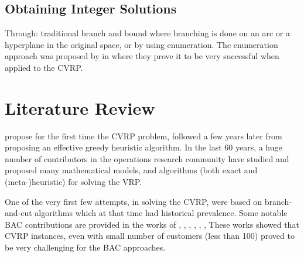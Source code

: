 \subsection{Obtaining Integer Solutions}

Through: traditional branch and bound where branching is done on an arc or a hyperplane in the original space, or by using enumeration.
The enumeration approach was proposed by \textcite{baldacci2008} in where they prove it to be very successful when applied to the CVRP.


\begin{comment}
\cite{jepsen2011}
The other method is enumeration which has proven to be very successful
for both cvrp[1] and vrptw[3]. In enumeration an upper bound U B and
a lower bound LB are used. From reduced cost fixing of a binary variable
it is know that any non basic column with a reduced cost strictly greater
than the gap ub − lb can not be part of an integer solution which is an
improvement of the current solution. This complete set of columns can be
found by solving an espprc using the dominance rule in proposition 5 and
bounding functions. Once we have added the columns with reduced cost less
than or equal to the gap the resulting problem can be solved as an integer
optimization problem.
\end{comment}

\section{Literature Review}
\label{sec:intro-literature-review}



\textcite{dantzig1959} propose for the first time the CVRP problem,
followed a few years later from \textcite{clarke1964} proposing
an effective greedy heuristic algorithm.
In the last 60 years, a huge number of contributors in
the operations research community have studied and proposed many
mathematical models, and algorithms (both exact and (meta-)heuristic)
for solving the VRP.

One of the very first few attempts, in solving the CVRP, were based on branch-and-cut algorithms
which at that time had historical prevalence.
Some notable BAC contributions are provided in the works of
\textcite{araqueg1994}, \textcite{augerat1995}, \textcite{blasum2000}, \textcite{achuthan2003}, \textcite{ralphs2003}, \textcite{lysgaard2004},
These works showed that CVRP instances, even with small number of customers (less than 100) proved
to be very challenging for the BAC approaches.

